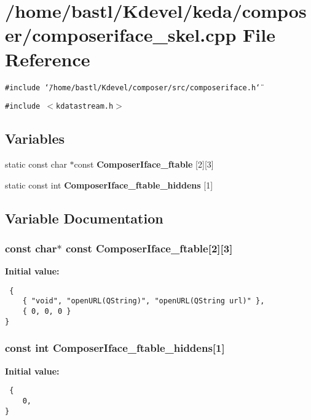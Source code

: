 \section{/home/bastl/Kdevel/keda/composer/composeriface\_\-skel.cpp File Reference}
\label{composeriface__skel_8cpp}
{\tt \#include \char`\"{}/home/bastl/Kdevel/composer/src/composeriface.h\char`\"{}}\par
{\tt \#include $<$kdatastream.h$>$}\par
\subsection*{Variables}
\begin{CompactItemize}
\item 
static const char $\ast$const {\bf Composer\-Iface\_\-ftable} [2][3]
\item 
static const int {\bf Composer\-Iface\_\-ftable\_\-hiddens} [1]
\end{CompactItemize}


\subsection{Variable Documentation}
\subsubsection{\setlength{\rightskip}{0pt plus 5cm}const char$\ast$ const {\bf Composer\-Iface\_\-ftable}[2][3]\hspace{0.3cm}{\tt  [static]}}\label{composeriface__skel_8cpp_a173badd16c220f1cc35dd79a467f642}


{\bf Initial value:}

\footnotesize\begin{verbatim} {
    { "void", "openURL(QString)", "openURL(QString url)" },
    { 0, 0, 0 }
}
\end{verbatim}\normalsize 
{}
\subsubsection{\setlength{\rightskip}{0pt plus 5cm}const int {\bf Composer\-Iface\_\-ftable\_\-hiddens}[1]\hspace{0.3cm}{\tt  [static]}}\label{composeriface__skel_8cpp_e4db04dceb4090801a0284525a0372a9}


{\bf Initial value:}

\footnotesize\begin{verbatim} {
    0,
}
\end{verbatim}\normalsize 
